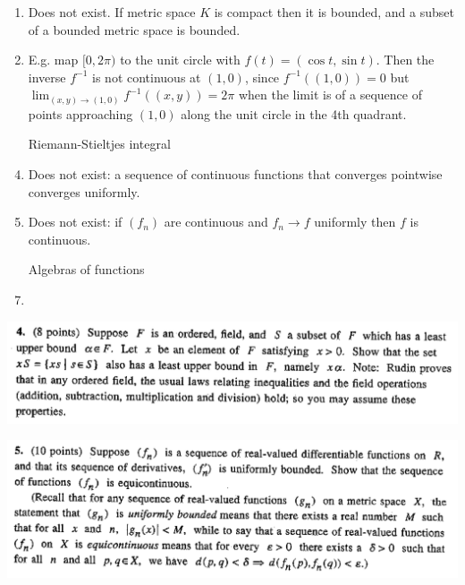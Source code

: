 \begin{enumerate}[label=(\alph*)]

\item Does not exist. If metric space $K$ is compact then it is bounded, and a subset of a bounded metric space is
  bounded.

\item E.g. map $[0, 2\pi)$ to the unit circle with $f(t) = (\cos t, \sin t)$. Then the inverse $f^{-1}$ is not
  continuous at $(1, 0)$, since $f^{-1}((1, 0)) = 0$ but $\lim_{(x, y) \to (1, 0)} f^{-1}((x, y)) = 2\pi$ when
  the limit is of a sequence of points approaching $(1, 0)$ along the unit circle in the 4th quadrant.





\item [Riemann-Stieltjes integral]

\item Does not exist: a sequence of continuous functions that converges pointwise converges uniformly.

\item Does not exist: if $(f_n)$ are continuous and $f_n \to f$ uniformly then $f$ is continuous.

\item [Algebras of functions]

\item



\end{enumerate}




\includegraphics[width=400pt]{img/analysis--berkeley-104-final--spring-2006-2fa6.png}



\includegraphics[width=400pt]{img/analysis--berkeley-104-final--spring-2006-0a2d.png}



